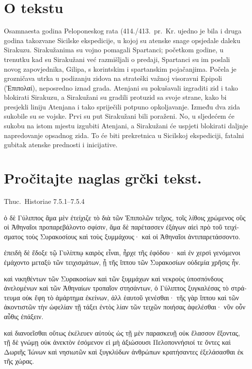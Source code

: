 


\section*{O tekstu}

Osamnaesta godina Peloponeskog rata (414./413.\ pr.~Kr. ujedno je bila i druga godina takozvane Sicilske ekspedicije, u kojoj su atenske snage opsjedale daleku Sirakuzu. Sirakužanima su vojno pomagali Spartanci; početkom godine, u trenutku kad su Sirakužani već razmišljali o predaji, Spartanci su im poslali novog zapovjednika, Gilipa, s korintskim i spartanskim pojačanjima. Počela je grozničava utrka u podizanju zidova na strateški važnoj visoravni Epipoli \textgreek[variant=ancient]{(Ἐπιπολαί),} neposredno iznad grada. Atenjani su pokušavali izgraditi zid i tako blokirati Sirakuzu, a Sirakužani su gradili protuzid sa svoje strane, kako bi presjekli liniju Atenjana i tako spriječili potpuno opkoljavanje. Između dva zida sukobile su se vojske. Prvi su put Sirakužani bili poraženi. No, u sljedećem će sukobu na istom mjestu izgubiti Atenjani, a Sirakužani će uspjeti blokirati daljnje napredovanje opsadnog zida. To će biti prekretnica u Sicilskoj ekspediciji, fatalni gubitak atenske prednosti i inicijative.

\newpage

\section*{Pročitajte naglas grčki tekst.}

Thuc.\ Historiae 7.5.1–7.5.4


\medskip


{\large

\begin{greek}

\noindent ὁ δὲ Γύλιππος ἅμα μὲν ἐτείχιζε τὸ διὰ τῶν Ἐπιπολῶν τεῖχος, τοῖς λίθοις χρώμενος οὓς οἱ Ἀθηναῖοι προπαρεβάλοντο σφίσιν, ἅμα δὲ παρέτασσεν ἐξάγων αἰεὶ πρὸ τοῦ τειχίσματος τοὺς Συρακοσίους καὶ τοὺς ξυμμάχους· καὶ οἱ Ἀθηναῖοι ἀντιπαρετάσσοντο.

ἐπειδὴ δὲ ἔδοξε τῷ Γυλίππῳ καιρὸς εἶναι, ἦρχε τῆς ἐφόδου· καὶ ἐν χερσὶ γενόμενοι ἐμάχοντο μεταξὺ τῶν τειχισμάτων, ᾗ τῆς ἵππου τῶν Συρακοσίων οὐδεμία χρῆσις ἦν.

καὶ νικηθέντων τῶν Συρακοσίων καὶ τῶν ξυμμάχων καὶ νεκροὺς ὑποσπόνδους ἀνελομένων καὶ τῶν Ἀθηναίων τροπαῖον στησάντων, ὁ Γύλιππος ξυγκαλέσας τὸ στράτευμα οὐκ ἔφη τὸ ἁμάρτημα ἐκείνων, ἀλλ ἑαυτοῦ γενέσθαι· τῆς γὰρ ἵππου καὶ τῶν ἀκοντιστῶν τὴν ὠφελίαν τῇ τάξει ἐντὸς λίαν τῶν τειχῶν ποιήσας ἀφελέσθαι· νῦν οὖν αὖθις ἐπάξειν.

καὶ διανοεῖσθαι οὕτως ἐκέλευεν αὐτοὺς ὡς τῇ μὲν παρασκευῇ οὐκ ἔλασσον ἕξοντας, τῇ δὲ γνώμῃ οὐκ ἀνεκτὸν ἐσόμενον εἰ μὴ ἀξιώσουσι Πελοποννήσιοί τε ὄντες καὶ Δωριῆς Ἰώνων καὶ νησιωτῶν καὶ ξυγκλύδων ἀνθρώπων κρατήσαντες ἐξελάσασθαι ἐκ τῆς χώρας.

\end{greek}

}



